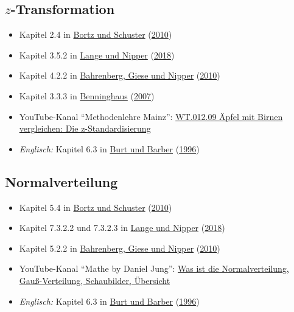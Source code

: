 \documentclass[
  11pt,
  ngerman,
  a4paper,
]{report}
\providecommand{\tightlist}{%
  \setlength{\itemsep}{0pt}\setlength{\parskip}{0pt}}
\begin{document}
\hypertarget{z-transformation-1}{%
\subsection{\texorpdfstring{\(z\)-Transformation}{z-Transformation}}\label{z-transformation-1}}

\begin{itemize}
\tightlist
\item
  Kapitel 2.4 in \protect\hyperlink{ref-bortz}{Bortz und Schuster} (\protect\hyperlink{ref-bortz}{2010})
\item
  Kapitel 3.5.2 in \protect\hyperlink{ref-delange}{Lange und Nipper} (\protect\hyperlink{ref-delange}{2018})
\item
  Kapitel 4.2.2 in \protect\hyperlink{ref-bahrenberg}{Bahrenberg, Giese und Nipper} (\protect\hyperlink{ref-bahrenberg}{2010})
\item
  Kapitel 3.3.3 in \protect\hyperlink{ref-benninghaus}{Benninghaus} (\protect\hyperlink{ref-benninghaus}{2007})
\item
  YouTube-Kanal \enquote{Methodenlehre Mainz}: \href{https://www.youtube.com/watch?v=AiucvUlIP8k}{WT.012.09 Äpfel mit Birnen vergleichen: Die z-Standardisierung}
\item
  \emph{Englisch:} Kapitel 6.3 in \protect\hyperlink{ref-burt}{Burt und Barber} (\protect\hyperlink{ref-burt}{1996})
\end{itemize}

\hypertarget{normalverteilung-1}{%
\subsection{Normalverteilung}\label{normalverteilung-1}}

\begin{itemize}
\tightlist
\item
  Kapitel 5.4 in \protect\hyperlink{ref-bortz}{Bortz und Schuster} (\protect\hyperlink{ref-bortz}{2010})
\item
  Kapitel 7.3.2.2 und 7.3.2.3 in \protect\hyperlink{ref-delange}{Lange und Nipper} (\protect\hyperlink{ref-delange}{2018})
\item
  Kapitel 5.2.2 in \protect\hyperlink{ref-bahrenberg}{Bahrenberg, Giese und Nipper} (\protect\hyperlink{ref-bahrenberg}{2010})
\item
  YouTube-Kanal \enquote{Mathe by Daniel Jung}: \href{https://www.youtube.com/watch?v=_f1vgWUiavY}{Was ist die Normalverteilung, Gauß-Verteilung, Schaubilder, Übersicht}
\item
  \emph{Englisch:} Kapitel 6.3 in \protect\hyperlink{ref-burt}{Burt und Barber} (\protect\hyperlink{ref-burt}{1996})
\end{itemize}
\end{document}
